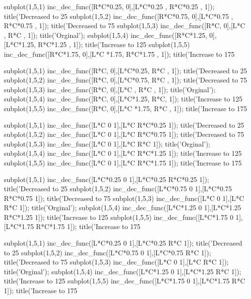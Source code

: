
subplot(1,5,1)
inc_dec_func([R*C*0.25, 0],[L*C*0.25 , R*C*0.25 , 1]);
title('Decreased to 25%
subplot(1,5,2)
inc_dec_func([R*C*0.75, 0],[L*C*0.75 , R*C*0.75 , 1]);
title('Decreased to 75%
subplot(1,5,3)
inc_dec_func([R*C, 0],[L*C , R*C , 1]);
title('Orginal');
subplot(1,5,4)
inc_dec_func([R*C*1.25, 0],[L*C*1.25, R*C*1.25 , 1]);
title('Increase to 125%
subplot(1,5,5)
inc_dec_func([R*C*1.75, 0],[L*C *1.75, R*C*1.75 , 1]);
title('Increase to 175%




subplot(1,5,1)
inc_dec_func([R*C, 0],[L*C*0.25, R*C , 1]);
title('Decreased to 25%
subplot(1,5,2)
inc_dec_func([R*C, 0],[L*C*0.75, R*C , 1]);
title('Decreased to 75%
subplot(1,5,3)
inc_dec_func([R*C, 0],[L*C , R*C , 1]);
title('Orginal');
subplot(1,5,4)
inc_dec_func([R*C, 0],[L*C*1.25, R*C, 1]);
title('Increase to 125%
subplot(1,5,5)
inc_dec_func([R*C, 0],[L*C *1.75, R*C , 1]);
title('Increase to 175%


subplot(1,5,1)
inc_dec_func([L*C 0 1],[L*C R*C*0.25 1]);
title('Decreased to 25%
subplot(1,5,2)
inc_dec_func([L*C 0 1],[L*C R*C*0.75 1]);
title('Decreased to 75%
subplot(1,5,3)
inc_dec_func([L*C 0 1],[L*C R*C 1]);
title('Orginal');
subplot(1,5,4)
inc_dec_func([L*C 0 1],[L*C R*C*1.25 1]);
title('Increase to 125%
subplot(1,5,5)
inc_dec_func([L*C 0 1],[L*C R*C*1.75 1]);
title('Increase to 175%



subplot(1,5,1)
inc_dec_func([L*C*0.25 0 1],[L*C*0.25 R*C*0.25 1]);
title('Decreased to 25%
subplot(1,5,2)
inc_dec_func([L*C*0.75 0 1],[L*C*0.75 R*C*0.75 1]);
title('Decreased to 75%
subplot(1,5,3)
inc_dec_func([L*C 0 1],[L*C R*C 1]);
title('Orginal');
subplot(1,5,4)
inc_dec_func([L*C*1.25 0 1],[L*C*1.25 R*C*1.25 1]);
title('Increase to 125%
subplot(1,5,5)
inc_dec_func([L*C*1.75 0 1],[L*C*1.75 R*C*1.75 1]);
title('Increase to 175%




subplot(1,5,1)
inc_dec_func([L*C*0.25 0 1],[L*C*0.25 R*C 1]);
title('Decreased to 25%
subplot(1,5,2)
inc_dec_func([L*C*0.75 0 1],[L*C*0.75 R*C 1]);
title('Decreased to 75%
subplot(1,5,3)
inc_dec_func([L*C 0 1],[L*C R*C 1]);
title('Orginal');
subplot(1,5,4)
inc_dec_func([L*C*1.25 0 1],[L*C*1.25 R*C 1]);
title('Increase to 125%
subplot(1,5,5)
inc_dec_func([L*C*1.75 0 1],[L*C*1.75 R*C 1]);
title('Increase to 175%
